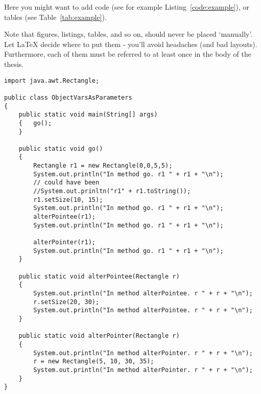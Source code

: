 Here you might want to add code (see for example Listing~\ref{code:example}), or tables (see Table~\ref{tab:example}).

Note that figures, listings, tables, and so on, should never be placed `manually'. Let LaTeX decide where to put them - you'll avoid headaches (and bad layouts). Furthermore, each of them must be referred to at least once in the body of the thesis.

\begin{verbatim}
import java.awt.Rectangle;

public class ObjectVarsAsParameters
{	
    public static void main(String[] args)
    {	go();
    }
    
    public static void go()
    {	
        Rectangle r1 = new Rectangle(0,0,5,5);
        System.out.println("In method go. r1 " + r1 + "\n");
        // could have been 
        //System.out.prinltn("r1" + r1.toString());
        r1.setSize(10, 15);
        System.out.println("In method go. r1 " + r1 + "\n");
        alterPointee(r1);
        System.out.println("In method go. r1 " + r1 + "\n");
        
        alterPointer(r1);
        System.out.println("In method go. r1 " + r1 + "\n");
    }
    
    public static void alterPointee(Rectangle r)
    {	
        System.out.println("In method alterPointee. r " + r + "\n");
        r.setSize(20, 30);
        System.out.println("In method alterPointee. r " + r + "\n");
    }
    
    public static void alterPointer(Rectangle r)
    {	
        System.out.println("In method alterPointer. r " + r + "\n");
        r = new Rectangle(5, 10, 30, 35);
        System.out.println("In method alterPointer. r " + r + "\n");
    }
}
\end{verbatim}

